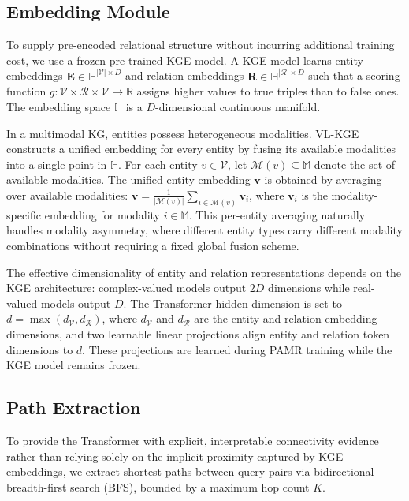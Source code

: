 \documentclass[runningheads]{llncs}
\begin{document}
\subsection{Embedding Module}
\label{sec:embedding-module}

To supply pre-encoded relational structure without incurring additional
training cost, we use a frozen pre-trained KGE model.  A KGE model
learns entity embeddings $\mathbf{E} \in \mathbb{H}^{|\mathcal{V}| \times D}$
and relation embeddings $\mathbf{R} \in \mathbb{H}^{|\mathcal{R}| \times D}$
such that a scoring function $g: \mathcal{V} \times \mathcal{R} \times
\mathcal{V} \to \mathbb{R}$ assigns higher values to true triples
than to false ones.  The embedding space $\mathbb{H}$ is a
$D$-dimensional continuous manifold.

In a multimodal KG, entities possess heterogeneous modalities.
VL-KGE~\cite{efthymiou2026vlkge} constructs a unified embedding for
every entity by fusing its available modalities into a single point
in $\mathbb{H}$.  For each entity $v \in \mathcal{V}$, let
$\mathcal{M}(v) \subseteq \mathbb{M}$ denote the set of available
modalities.  The unified entity embedding $\mathbf{v}$ is obtained
by averaging over available modalities:
$\mathbf{v} = \frac{1}{|\mathcal{M}(v)|} \sum_{i \in \mathcal{M}(v)} \mathbf{v}_i$,
where $\mathbf{v}_i$ is the modality-specific embedding for modality
$i \in \mathbb{M}$.  This per-entity averaging naturally handles
modality asymmetry, where different entity types carry different
modality combinations without requiring a fixed global fusion scheme.

The effective dimensionality of entity and relation representations
depends on the KGE architecture: complex-valued models output $2D$
dimensions while real-valued models output $D$. The Transformer
hidden dimension is set to $d = \max(d_{\mathcal{V}},
d_{\mathcal{R}})$, where $d_{\mathcal{V}}$ and $d_{\mathcal{R}}$ are the
entity and relation embedding dimensions, and two learnable linear
projections align entity
and relation token dimensions to $d$. These
projections are learned during PAMR training while the KGE model
remains frozen.

\subsection{Path Extraction}
\label{sec:path-extraction}

To provide the Transformer with explicit, interpretable connectivity evidence rather than
relying solely on the implicit proximity captured by KGE embeddings, we extract shortest
paths between query pairs via bidirectional breadth-first search (BFS), bounded by a
maximum hop count $K$.
\end{document}
